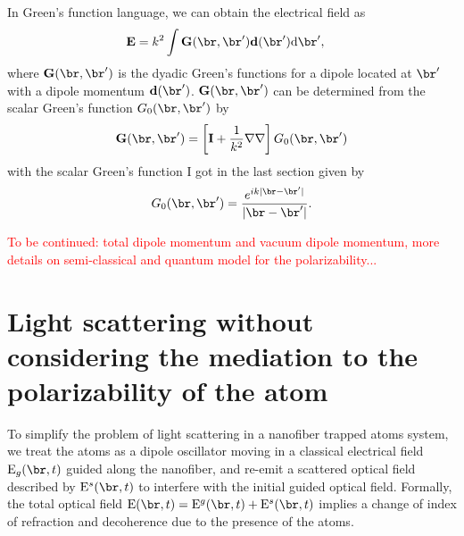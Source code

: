 \documentclass[]{report}
\begin{document}
In Green's function language, we can obtain the electrical field as
\begin{align}\label{EGd}
\mathbf{E} &= k^2 \int \mathbf{G}(\br,\br')\mathbf{d}(\br') \mathrm{d}\br', 
\end{align}
where $ \mathbf{G}(\br,\br') $ is the dyadic Green's functions for a dipole located at $ \br' $ with a dipole momentum $ \mathbf{d}(\br') $. $\mathbf{G}(\br,\br')$ can be determined from the scalar Green's function $G_0(\br,\br')$ by 
\begin{align}
\mathbf{G}(\br,\br') = \left[\mathbf{I} + \frac{1}{k^2}\nabla\nabla \right]G_0(\br,\br')
\end{align}
with the scalar Green's function I got in the last section given by
\begin{align}\label{scalarG}
G_0(\br,\br') = \frac{e^{ik|\br-\br'|}}{|\br-\br'|}. 
\end{align}


\textcolor{red}{To be continued: total dipole momentum and vacuum dipole momentum, more details on semi-classical and quantum model for the polarizability...}







\section{Light scattering without considering the mediation to the polarizability of the atom}
To simplify the problem of light scattering in a nanofiber trapped atoms system, we treat the atoms as a dipole oscillator moving in a classical electrical field $ \mathrm{E}_{g}(\br,t) $ guided along the nanofiber, and re-emit a scattered optical field described by $ \mathrm{E}^s(\br,t) $ to interfere with the initial guided optical field. Formally, the total optical field $ \mathrm{E}(\br,t)= \mathrm{E}^g(\br,t)  + \mathrm{E}^s(\br,t) $ implies a change of index of refraction and decoherence due to the presence of the atoms. 
\end{document}
